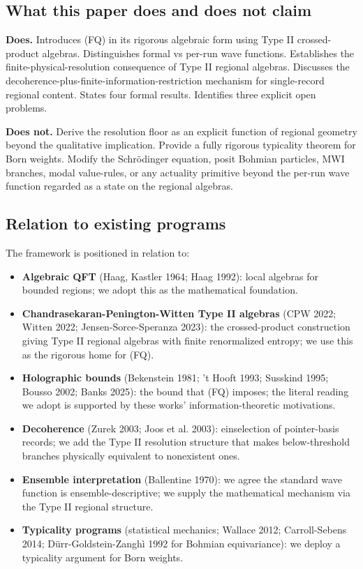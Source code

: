 \documentclass[11pt,a4paper]{article}
\begin{document}
\subsection{What this paper does and does not claim}

\textbf{Does.} Introduces (FQ) in its rigorous algebraic form using Type II crossed-product algebras. Distinguishes formal vs per-run wave functions. Establishes the finite-physical-resolution consequence of Type II regional algebras. Discusses the decoherence-plus-finite-information-restriction mechanism for single-record regional content. States four formal results. Identifies three explicit open problems.

\textbf{Does not.} Derive the resolution floor as an explicit function of regional geometry beyond the qualitative implication. Provide a fully rigorous typicality theorem for Born weights. Modify the Schrödinger equation, posit Bohmian particles, MWI branches, modal value-rules, or any actuality primitive beyond the per-run wave function regarded as a state on the regional algebras.

\subsection{Relation to existing programs}

The framework is positioned in relation to:

\begin{itemize}
  \item \textbf{Algebraic QFT} (Haag, Kastler 1964; Haag 1992): local algebras for bounded regions; we adopt this as the mathematical foundation.
  \item \textbf{Chandrasekaran-Penington-Witten Type II algebras} (CPW 2022; Witten 2022; Jensen-Sorce-Speranza 2023): the crossed-product construction giving Type II regional algebras with finite renormalized entropy; we use this as the rigorous home for (FQ).
  \item \textbf{Holographic bounds} (Bekenstein 1981; 't Hooft 1993; Susskind 1995; Bousso 2002; Banks 2025): the bound that (FQ) imposes; the literal reading we adopt is supported by these works' information-theoretic motivations.
  \item \textbf{Decoherence} (Zurek 2003; Joos et al. 2003): einselection of pointer-basis records; we add the Type II resolution structure that makes below-threshold branches physically equivalent to nonexistent ones.
  \item \textbf{Ensemble interpretation} (Ballentine 1970): we agree the standard wave function is ensemble-descriptive; we supply the mathematical mechanism via the Type II regional structure.
  \item \textbf{Typicality programs} (statistical mechanics; Wallace 2012; Carroll-Sebens 2014; Dürr-Goldstein-Zanghì 1992 for Bohmian equivariance): we deploy a typicality argument for Born weights.
\end{itemize}
\end{document}

